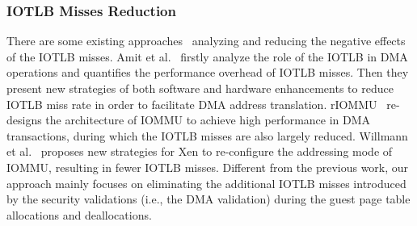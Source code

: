 \subsubsection{IOTLB Misses Reduction} 
There are some existing approaches~\cite{amit2012iommu, malka2015riommu, willmann2008protection} analyzing and reducing the negative effects of the IOTLB misses.
Amit et al.~\cite{amit2012iommu} firstly analyze the role of the IOTLB in DMA operations and quantifies the performance overhead of IOTLB misses. Then they present new strategies of both software and hardware enhancements to reduce IOTLB miss rate in order to facilitate DMA address translation. rIOMMU~\cite{malka2015riommu} re-designs the architecture of IOMMU to achieve high performance in DMA transactions, during which the IOTLB misses are also largely reduced. Willmann et al.~\cite{willmann2008protection} proposes new strategies for Xen to re-configure the addressing mode of IOMMU, resulting in fewer IOTLB misses.
Different from the previous work, our approach mainly focuses on eliminating the additional IOTLB misses introduced by the security validations (i.e., the DMA validation) during the guest page table allocations and deallocations.




